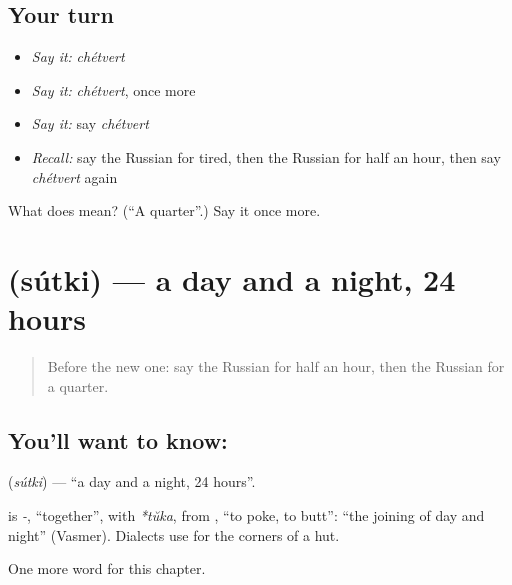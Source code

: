 \subsection*{Your turn}
\begin{itemize}
\raggedright
  \item \emph{Say it:} \emph{chétvert}
  \item \emph{Say it:} \emph{chétvert}, once more
  \item \emph{Say it:} say \emph{chétvert}
  \item \emph{Recall:} say the Russian for tired, then the Russian for half an hour, then say \emph{chétvert} again
\end{itemize}

\begin{tcolorbox}[breakable,colback=teal!4,colframe=teal!35!black,title={Before you move on}]
What does  mean? (\textquotedblleft{}A quarter\textquotedblright{}.) Say it once more.
\end{tcolorbox}
\section[\texorpdfstring{\ru{сутки} (sútki)}{сутки (sútki)}]{ (sútki) — a day and a night, 24 hours}

\label{lesson:RU-C149-sutki}



\begin{quote}
Before the new one: say the Russian for half an hour, then the Russian for a quarter.
\end{quote}

\subsection*{You'll want to know: }
\textbf{} (\emph{sútki}) — \textquotedblleft{}a day and a night, 24 hours\textquotedblright{}.

\begin{cousinweb}
\textbf{} is \emph{-}, \textquotedblleft{}together\textquotedblright{}, with \emph{*tŭka}, from \emph{}, \textquotedblleft{}to poke, to butt\textquotedblright{}: \textquotedblleft{}the joining of day and night\textquotedblright{} (Vasmer). Dialects use \emph{} for the corners of a hut.
\end{cousinweb}

\begin{grammarlens}[title={What you've built}]
One more word for this chapter.
\end{grammarlens}

